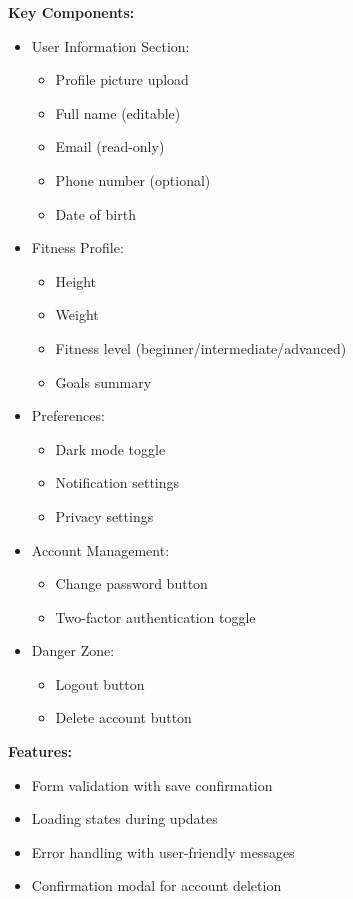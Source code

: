 \documentclass[12pt,a4paper]{article}
\begin{document}
\textbf{Key Components:}
\begin{itemize}[noitemsep, topsep=2pt]
  \item User Information Section:
    \begin{itemize}[noitemsep, topsep=0pt]
      \item Profile picture upload
      \item Full name (editable)
      \item Email (read-only)
      \item Phone number (optional)
      \item Date of birth
    \end{itemize}
  \item Fitness Profile:
    \begin{itemize}[noitemsep, topsep=0pt]
      \item Height
      \item Weight
      \item Fitness level (beginner/intermediate/advanced)
      \item Goals summary
    \end{itemize}
  \item Preferences:
    \begin{itemize}[noitemsep, topsep=0pt]
      \item Dark mode toggle
      \item Notification settings
      \item Privacy settings
    \end{itemize}
  \item Account Management:
    \begin{itemize}[noitemsep, topsep=0pt]
      \item Change password button
      \item Two-factor authentication toggle
    \end{itemize}
  \item Danger Zone:
    \begin{itemize}[noitemsep, topsep=0pt]
      \item Logout button
      \item Delete account button
    \end{itemize}
\end{itemize}

\textbf{Features:}
\begin{itemize}[noitemsep, topsep=2pt]
  \item Form validation with save confirmation
  \item Loading states during updates
  \item Error handling with user-friendly messages
  \item Confirmation modal for account deletion
\end{itemize}
\end{document}
